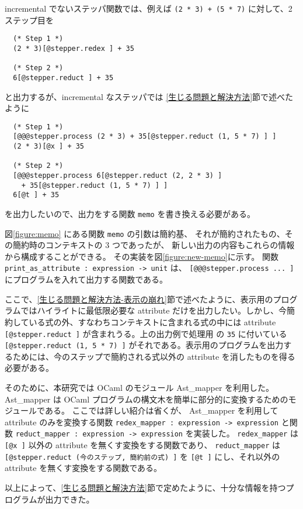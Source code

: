 incremental でないステッパ関数では、例えば \texttt{(2 * 3) + (5 * 7)} に対して、2 ステップ目を
\begin{verbatim}
  (* Step 1 *)
  (2 * 3)[@stepper.redex ] + 35

  (* Step 2 *)
  6[@stepper.reduct ] + 35
\end{verbatim}
と出力するが、incremental なステッパでは \ref{生じる問題と解決方法}節で述べたように
\begin{verbatim}
  (* Step 1 *)
  [@@@stepper.process (2 * 3) + 35[@stepper.reduct (1, 5 * 7) ] ]
  (2 * 3)[@x ] + 35

  (* Step 2 *)
  [@@@stepper.process 6[@stepper.reduct (2, 2 * 3) ]
    + 35[@stepper.reduct (1, 5 * 7) ] ]
  6[@t ] + 35
\end{verbatim}
を出力したいので、出力をする関数 \texttt{memo} を書き換える必要がある。

図\ref{figure:memo} にある関数 \texttt{memo} の引数は簡約基、
それが簡約されたもの、その簡約時のコンテキストの 3 つであったが、
新しい出力の内容もこれらの情報から構成することができる。
その実装を図\ref{figure:new-memo}に示す。
関数 \texttt{print\_as\_attribute :\ expression -> unit} は、
\texttt{[@@@stepper.process ... ]} にプログラムを入れて出力する関数である。

ここで、\ref{生じる問題と解決方法-表示の崩れ}節で述べたように、表示用のプログラムではハイライトに最低限必要な attribute だけを出力したい。しかし、今簡約している式の外、すなわちコンテキストに含まれる式の中には attribute \texttt{[@stepper.reduct ]} が含まれうる。上の出力例で処理用
の \texttt{35} に付いている \texttt{[@stepper.reduct (1, 5 * 7) ]} がそれである。表示用のプログラムを出力するためには、今のステップで簡約される式以外の attribute を消したものを得る必要がある。

そのために、本研究では OCaml のモジュール Ast\_mapper を利用した。
Ast\_mapper は OCaml プログラムの構文木を簡単に部分的に変換するためのモジュールである。
ここでは詳しい紹介は省くが、
Ast\_mapper を利用して attribute のみを変換する関数
\texttt{redex\_mapper :\ expression -> expression} と関数
\texttt{reduct\_mapper :\ expression -> expression} を実装した。
\texttt{redex\_mapper} は \texttt{[@x ]} 以外の attribute を無くす変換をする関数であり、
\texttt{reduct\_mapper} は \texttt{[@stepper.reduct (今のステップ, 簡約前の式) ]} を
\texttt{[@t ]} にし、それ以外の attribute を無くす変換をする関数である。

以上によって、\ref{生じる問題と解決方法}節で定めたように、十分な情報を持つプログラムが出力できた。

